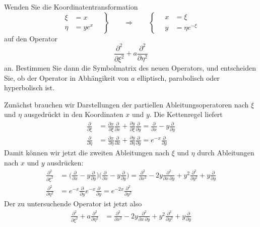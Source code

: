 Wenden Sie die Koordinatentransformation
\[
\left.
\begin{aligned}
\xi  &= x    \\
\eta &= ye^x 
\end{aligned}
\quad
\right\}
\qquad\Rightarrow\qquad
\left\{
\quad
\begin{aligned}
 x &= \xi\\
 y &= \eta e^{-\xi}
\end{aligned}
\right.
\]
auf den Operator
\[
\frac{\partial^2}{\partial \xi^2}+a\frac{\partial^2}{\partial \eta^2}
\]
an.
Bestimmen Sie dann die Symbolmatrix des neuen Operators, und entscheiden
Sie, ob der Operator in Abhängikeit von $a$ elliptisch, parabolisch oder
hyperbolisch ist.

\begin{loesung}
Zunächst brauchen wir Darstellungen der partiellen Ableitungsoperatoren
nach $\xi$ und $\eta$ ausgedrückt in den Koordinaten $x$ und $y$.
Die Kettenregel liefert
\begin{align*}
\frac{\partial}{\partial \xi}
&=
\frac{\partial x}{\partial \xi}\frac{\partial}{\partial x}
+
\frac{\partial y}{\partial \xi}\frac{\partial}{\partial y}
=
\frac{\partial}{\partial x}
-
y\frac{\partial}{\partial y}
\\
\frac{\partial}{\partial \eta}
&=
\frac{\partial x}{\partial \eta}\frac{\partial}{\partial x}
+
\frac{\partial y}{\partial \eta}\frac{\partial}{\partial y}
=
e^{-x} \frac{\partial}{\partial y}
\end{align*}
Damit können wir jetzt die zweiten Ableitungen nach $\xi$ und $\eta$ 
durch Ableitungen nach $x$ und $y$ ausdrücken:
\begin{align*}
\frac{\partial^2}{\partial\xi^2}
&=
\biggl(\frac{\partial}{\partial x}-y\frac{\partial}{\partial y}\biggr)
\biggl(\frac{\partial}{\partial x}-y\frac{\partial}{\partial y}\biggr)
=
\frac{\partial^2}{\partial x^2} - 2y\frac{\partial^2}{\partial x\,\partial y}
+y^2\frac{\partial^2}{\partial y^2}+y\frac{\partial}{\partial y}
\\
\frac{\partial^2}{\partial\eta^2}
&=
e^{-x}\frac{\partial}{\partial y}e^{-x}\frac{\partial}{\partial y}
=
e^{-2x}\frac{\partial^2}{\partial y^2}
\end{align*}
Der zu untersuchende Operator ist jetzt also
\begin{align*}
\frac{\partial^2}{\partial\xi^2}
+a
\frac{\partial^2}{\partial\eta^2}
&=
\frac{\partial^2}{\partial x^2} - 2y\frac{\partial^2}{\partial x\,\partial y}
+y^2\frac{\partial^2}{\partial y^2}+y\frac{\partial}{\partial y}

\end{align*}
\end{loesung}
